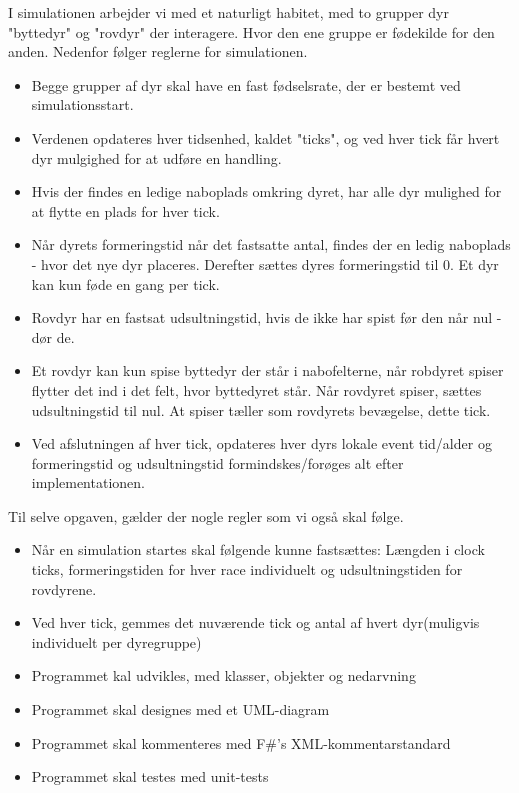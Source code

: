 \documentclass[a4paper]{article}
\begin{document}
    I simulationen arbejder vi med et naturligt habitet,
    med to grupper dyr "byttedyr" og "rovdyr" der interagere.
    Hvor den ene gruppe er fødekilde for den anden.
    Nedenfor følger reglerne for simulationen.

    \begin{itemize}
      \item Begge grupper af dyr skal have en fast fødselsrate, der er bestemt ved simulationsstart.
      \item Verdenen opdateres hver tidsenhed, kaldet "ticks", og ved hver tick får hvert dyr mulgighed for at udføre en handling.
      \item Hvis der findes en ledige naboplads omkring dyret, har alle dyr mulighed for at flytte en plads for hver tick.
      \item Når dyrets formeringstid når det fastsatte antal, findes der en ledig naboplads - hvor det nye dyr placeres. Derefter sættes dyres formeringstid til 0. Et dyr kan kun føde en gang per tick.
      \item Rovdyr har en fastsat udsultningstid, hvis de ikke har spist før den når nul - dør de.
      \item Et rovdyr kan kun spise byttedyr der står i nabofelterne, når robdyret spiser flytter det ind i det felt, hvor byttedyret står. Når rovdyret spiser, sættes udsultningstid til nul. At spiser tæller som rovdyrets bevægelse, dette tick.
      \item Ved afslutningen af hver tick, opdateres hver dyrs lokale event tid/alder og formeringstid og udsultningstid formindskes/forøges alt efter implementationen.
    \end{itemize}
    
    Til selve opgaven, gælder der nogle regler som vi også skal følge.
    \begin{itemize}
      \item Når en simulation startes skal følgende kunne fastsættes: Længden i clock ticks, formeringstiden for hver race individuelt og udsultningstiden for rovdyrene.
      \item Ved hver tick, gemmes det nuværende tick og antal af hvert dyr(muligvis individuelt per dyregruppe)
      \item Programmet kal udvikles, med klasser, objekter og nedarvning
      \item Programmet skal designes med et UML-diagram
      \item Programmet skal kommenteres med F\#'s XML-kommentarstandard
      \item Programmet skal testes med unit-tests
    \end{itemize}
\end{document}
